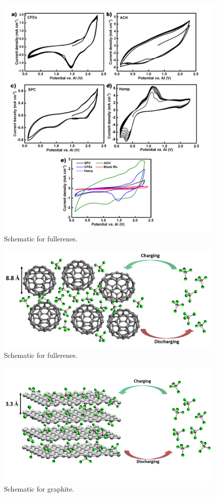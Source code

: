 \documentclass{article}
\begin{document}

\begin{figure}[h]
  \centering
  \includegraphics[width=\textwidth]{figures/fig6}
    \caption{Schematic for fullerenes.}
  \label{figures:fig1}
\end{figure}
\begin{figure}[h]
  \centering
  \includegraphics[width=\textwidth]{figures/fig2}
    \caption{Schematic for fullerenes.}
  \label{figures:fig1}
\end{figure}
\begin{figure}[h]
  \centering
  \includegraphics[width=\textwidth]{figures/fig3}
    \caption{Schematic for graphite.}
  \label{figures:fig1}
\end{figure}
\end{document}
